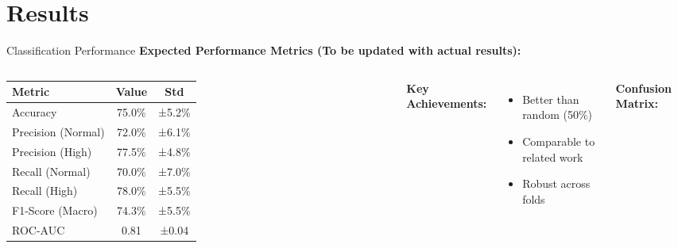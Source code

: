 \documentclass[aspectratio=169]{beamer}
\begin{document}
\section{Results}

\begin{frame}{Classification Performance}
\textbf{Expected Performance Metrics (To be updated with actual results):}

\begin{columns}[c]

\begin{table}[h]
\small
\begin{tabular}{@{}lcc@{}}
\toprule
\textbf{Metric} & \textbf{Value} & \textbf{Std} \\
\midrule
Accuracy & 75.0\% & ±5.2\% \\
Precision (Normal) & 72.0\% & ±6.1\% \\
Precision (High) & 77.5\% & ±4.8\% \\
Recall (Normal) & 70.0\% & ±7.0\% \\
Recall (High) & 78.0\% & ±5.5\% \\
F1-Score (Macro) & 74.3\% & ±5.5\% \\
ROC-AUC & 0.81 & ±0.04 \\
\bottomrule
\end{tabular}
\end{table}

\textbf{Key Achievements:}
\begin{itemize}
    \item Better than random (50\%)
    \item Comparable to related work
    \item Robust across folds
\end{itemize}

\textbf{Confusion Matrix:}

\begin{center}
\end{center}
\end{columns}
\end{frame}
\end{document}
